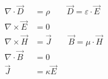 \begin{align*}
    \nabla \cdot \vec{D}  & = \rho \qquad \vec{D} = \varepsilon \cdot \vec{E} \\
    \nabla \times \vec{E} & = 0                                               \\
    \nabla \times \vec{H} & = \vec{J} \qquad \vec{B} = \mu \cdot \vec{H}      \\
    \nabla \cdot \vec{B}  & = 0                                               \\
    \vec{J}               & = \kappa \vec{E}
\end{align*}

